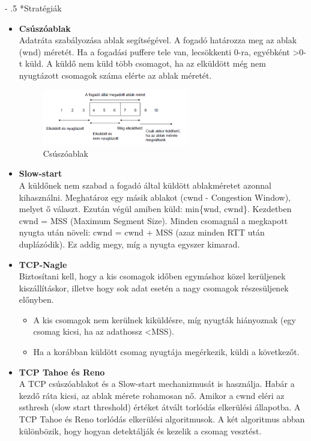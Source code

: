 \documentclass[12pt]{article}
\makeatletter
\renewcommand\paragraph{%
	\@startsection{paragraph}{4}{0mm}%
	{-\baselineskip}%
	{.5\baselineskip}%
	{\normalfont\normalsize\bfseries}}
\makeatother
\begin{document}
	\paragraph*{Stratégiák}
	\begin{itemize}
		\item \textbf{Csúszóablak} \\
            Adatráta szabályozása ablak segítségével. A fogadó határozza meg az ablak (wnd) méretét. Ha a fogadási puffere tele van, lecsökkenti 0-ra, egyébként \textgreater0-t küld. A küldő nem küld több csomagot, ha az elküldött még nem nyugtázott csomagok száma elérte az ablak méretét. 	
			\begin{figure}[H]
        \centering
        \includegraphics[width=0.6\textwidth]{img/csuszoablak.png}
        \caption{Csúszóablak}
			\end{figure}
		\item \textbf{Slow-start} \\
        A küldőnek nem szabad a fogadó által küldött ablakméretet azonnal kihasználni. Meghatároz egy másik ablakot (cwnd - Congestion Window), melyet ő választ. Ezután végül amiben küld: min\{wnd, cwnd\}. Kezdetben cwnd = MSS (Maximum Segment Size). Minden csomagnál a megkapott nyugta után növeli: cwnd = cwnd + MSS (azaz minden RTT után duplázódik). Ez addig megy, míg a nyugta egyszer kimarad.
		\item \textbf{TCP-Nagle} \\
		Biztosítani kell, hogy a kis csomagok időben egymáshoz közel kerüljenek kiszállításkor, illetve hogy sok adat esetén a nagy csomagok részesüljenek előnyben.
        \begin{itemize}
            \item A kis csomagok nem kerülnek kiküldésre, míg nyugták hiányoznak (egy csomag kicsi, ha az adathossz \textless MSS).
            \item Ha a korábban küldött csomag nyugtája megérkezik, küldi a következőt.
        \end{itemize}
		\item \textbf{TCP Tahoe és Reno} \\
        A TCP csúszóablakot és a Slow-start mechanizmusát is használja. Habár a kezdő ráta kicsi, az ablak mérete rohamosan nő. Amikor a cwnd eléri az ssthresh (slow start threshold) értéket átvált torlódás elkerülési állapotba. A TCP Tahoe és Reno torlódás elkerülési algoritmusok. A két algoritmus abban különbözik, hogy hogyan detektálják és kezelik a csomag vesztést. \\


\end{itemize}
\end{document}
